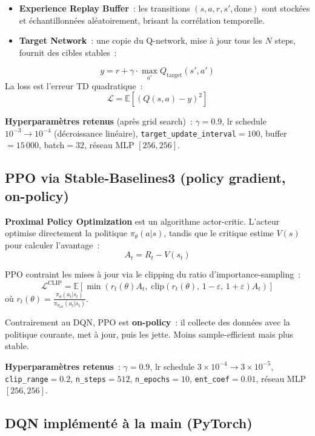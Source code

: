 \documentclass[11pt, a4paper]{article}
\begin{document}
\begin{itemize}[nosep]
    \item \textbf{Experience Replay Buffer}~: les transitions $(s, a, r, s', \text{done})$ sont stockées et échantillonnées aléatoirement, brisant la corrélation temporelle.
    \item \textbf{Target Network}~: une copie du Q-network, mise à jour tous les $N$ steps, fournit des cibles stables~:
\end{itemize}
\[
    y = r + \gamma \cdot \max_{a'} Q_{\text{target}}(s', a')
\]
La loss est l'erreur TD quadratique~:
\[
    \mathcal{L} = \mathbb{E}\left[\left(Q(s,a) - y\right)^2\right]
\]

\textbf{Hyperparamètres retenus} (après grid search)~: $\gamma=0.9$, lr schedule $10^{-3}\to 10^{-4}$ (décroissance linéaire), \texttt{target\_update\_interval}$=100$, buffer$=15\,000$, batch$=32$, réseau MLP $[256, 256]$.

\subsection{PPO via Stable-Baselines3 (policy gradient, on-policy)}

\textbf{Proximal Policy Optimization} \cite{schulman2017} est un algorithme actor-critic. L'acteur optimise directement la politique $\pi_\theta(a|s)$, tandis que le critique estime $V(s)$ pour calculer l'avantage~:
\[
    A_t = R_t - V(s_t)
\]

PPO contraint les mises à jour via le clipping du ratio d'importance-sampling~:
\[
    \mathcal{L}^{\text{CLIP}} = \mathbb{E}\left[\min\left(r_t(\theta) A_t,\;\text{clip}\left(r_t(\theta),\, 1-\varepsilon,\, 1+\varepsilon\right) A_t\right)\right]
\]
où $r_t(\theta) = \frac{\pi_\theta(a_t|s_t)}{\pi_{\theta_{\text{old}}}(a_t|s_t)}$.

Contrairement au DQN, PPO est \textbf{on-policy}~: il collecte des données avec la politique courante, met à jour, puis les jette. Moins sample-efficient mais plus stable.

\textbf{Hyperparamètres retenus}~: $\gamma=0.9$, lr schedule $3\!\times\!10^{-4}\to 3\!\times\!10^{-5}$, \texttt{clip\_range}$=0.2$, \texttt{n\_steps}$=512$, \texttt{n\_epochs}$=10$, \texttt{ent\_coef}$=0.01$, réseau MLP $[256, 256]$.

\subsection{DQN implémenté à la main (PyTorch)}
\end{document}

